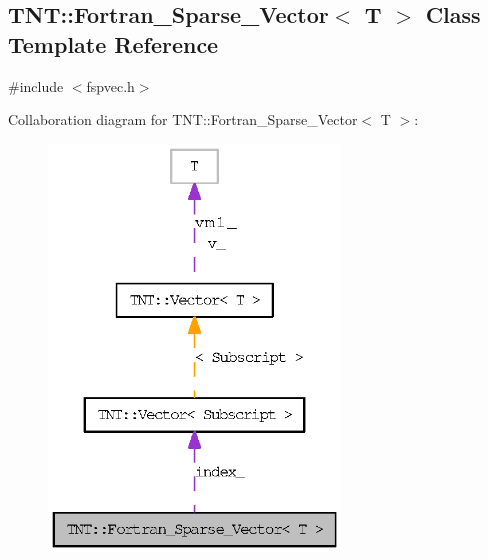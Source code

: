 \subsection{TNT::Fortran\_\-Sparse\_\-Vector$<$ T $>$ Class Template Reference}
\label{class_t_n_t_1_1_fortran___sparse___vector}


{\ttfamily \#include $<$fspvec.h$>$}



Collaboration diagram for TNT::Fortran\_\-Sparse\_\-Vector$<$ T $>$:
\nopagebreak
\begin{figure}[H]
\begin{center}
\leavevmode
\includegraphics[width=220pt]{class_t_n_t_1_1_fortran___sparse___vector__coll__graph}
\end{center}
\end{figure}
